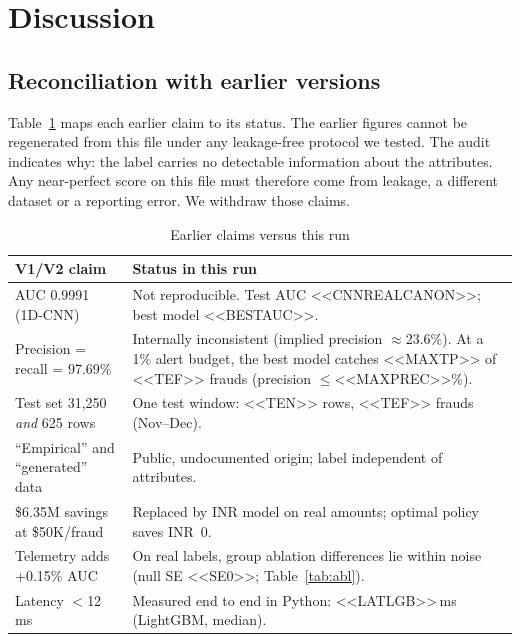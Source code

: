 \documentclass[conference]{IEEEtran}
\newcommand{\inr}{INR~}
\begin{document}
\section{Discussion}
\subsection{Reconciliation with earlier versions}
Table~\ref{tab:recon} maps each earlier claim to its status. The earlier figures cannot be regenerated from this file under any leakage-free protocol we tested. The audit indicates why: the label carries no detectable information about the attributes. Any near-perfect score on this file must therefore come from leakage, a different dataset or a reporting error. We withdraw those claims.

\begin{table}[t]
\centering
\caption{Earlier claims versus this run}\label{tab:recon}
\footnotesize
\begin{tabular}{@{}p{3.1cm}p{4.6cm}@{}}
\toprule
V1/V2 claim & Status in this run \\
\midrule
AUC 0.9991 (1D-CNN) & Not reproducible. Test AUC <<CNNREALCANON>>; best model <<BESTAUC>>. \\
Precision = recall = 97.69\% & Internally inconsistent (implied precision $\approx$23.6\%). At a 1\% alert budget, the best model catches <<MAXTP>> of <<TEF>> frauds (precision $\le$<<MAXPREC>>\%). \\
Test set 31,250 \emph{and} 625 rows & One test window: <<TEN>> rows, <<TEF>> frauds (Nov--Dec). \\
``Empirical'' and ``generated'' data & Public, undocumented origin; label independent of attributes. \\
\$6.35M savings at \$50K/fraud & Replaced by INR model on real amounts; optimal policy saves \inr0. \\
Telemetry adds +0.15\% AUC & On real labels, group ablation differences lie within noise (null SE <<SE0>>; Table~\ref{tab:abl}). \\
Latency $<$12\,ms & Measured end to end in Python: <<LATLGB>>\,ms (LightGBM, median). \\
\bottomrule
\end{tabular}
\end{table}
\end{document}

